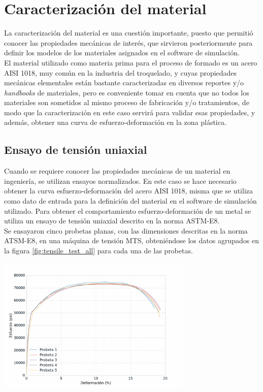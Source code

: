 \section{Caracterización del material}

La caracterización del material es una cuestión importante, puesto que permitió conocer 
las propiedades mecánicas de interés, que sirvieron posteriormente para definir los 
modelos de los materiales asignados en el software de simulación.\\

El material utilizado como materia prima para el proceso de formado es un acero AISI 1018, 
muy común en la industria del troquelado, y cuyas propiedades mecánicas elementales están 
bastante caracterizadas en diversos reportes y/o \textit{handbooks} de materiales, pero 
es conveniente tomar en cuenta que no todos los materiales son sometidos al mismo proceso 
de fabricación y/o tratamientos, de modo que la caracterización en este caso servirá 
para validar esas propiedades, y además, obtener una curva de esfuerzo-deformación en la 
zona plástica.

\subsection{Ensayo de tensión uniaxial}

Cuando se requiere conocer las propiedades mecánicas de un material en ingeniería, se utilizan ensayos 
normalizados. En este caso se hace necesario obtener la curva esfuerzo-deformación del 
acero AISI 1018, misma que se utiliza como dato de entrada para la definición del material 
en el software de simulación utilizado. Para obtener el comportamiento esfuerzo-deformación 
de un metal se utiliza un ensayo de tensión uniaxial descrito en la norma ASTM-E8. ~\cite{ASTME8} \\

Se ensayaron cinco probetas planas, con las dimensiones descritas en la norma ATSM-E8, en una 
máquina de tensión MTS, obteniéndose los datos agrupados en la figura \ref{fig:tensile_test_all} para 
cada una de las probetas.\\

\begin{center}
\includegraphics[width=0.7\textwidth]{src/ch3/tensile_test_all.pdf}
\label{fig:tensile_test_all}
\end{center}

